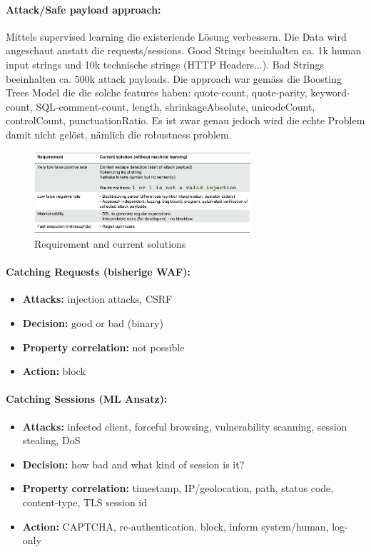 \documentclass[10pt,a4paper]{article}
\begin{document}
\paragraph*{Attack/Safe payload approach:} Mittels supervised learning die existeriende Lösung verbessern. Die Data wird angeschaut anstatt die requests/sessions. Good Strings beeinhalten ca. 1k human input strings und 10k technische strings (HTTP Headers...). Bad Strings beeinhalten ca. 500k attack payloads. Die approach war gemäss die Boosting Trees Model die die solche features haben: quote-count, quote-parity, keyword-count, SQL-comment-count, length, shrinkageAbsolute, unicodeCount, controlCount, punctuationRatio. Es ist zwar genau jedoch wird die echte Problem damit nicht gelöst, nämlich die robustness problem.
\begin{figure}[H]
    \begin{center}
    \includegraphics[width=8cm]{images/requirementML.png}
    \caption{Requirement and current solutions}
    \label{requirementML}
    \end{center}
\end{figure}

\paragraph*{Catching Requests (bisherige WAF):}
\begin{itemize}[noitemsep,topsep=0pt,leftmargin=*]
	\item \textbf{Attacks:} injection attacks, CSRF
	\item \textbf{Decision:} good or bad (binary)
	\item \textbf{Property correlation:} not possible
	\item \textbf{Action:} block
\end{itemize}
\paragraph*{Catching Sessions (ML Ansatz):}
\begin{itemize}[noitemsep,topsep=0pt,leftmargin=*]
	\item \textbf{Attacks:} infected client, forceful browsing, vulnerability scanning, session stealing, DoS
	\item \textbf{Decision:} how bad and what kind of session is it?
	\item \textbf{Property correlation:} timestamp, IP/geolocation, path, status code, content-type, TLS session id
	\item \textbf{Action:} CAPTCHA, re-authentication, block, inform system/human, log-only
\end{itemize}
\end{document}
